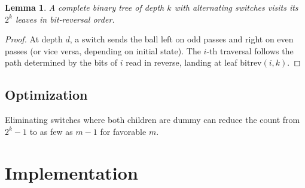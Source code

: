 \documentclass[11pt,a4paper]{article}
\newtheorem{lemma}{Lemma}
\begin{document}
\begin{lemma}
A complete binary tree of depth $k$ with alternating switches visits its $2^k$ leaves in bit-reversal order.
\end{lemma}
\begin{proof}
At depth $d$, a switch sends the ball left on odd passes and right on even passes (or vice versa, depending on initial state). The $i$-th traversal follows the path determined by the bits of $i$ read in reverse, landing at leaf $\text{bitrev}(i, k)$.
\end{proof}

\subsection{Optimization}

Eliminating switches where both children are dummy can reduce the count from $2^k - 1$ to as few as $m - 1$ for favorable $m$.

\section{Implementation}
\end{document}
